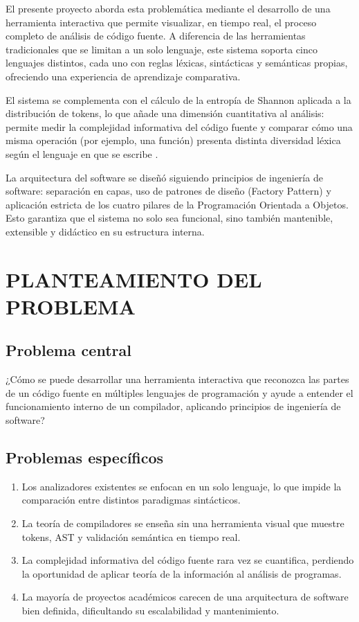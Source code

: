 \documentclass[12pt,a4paper]{article}
\begin{document}
El presente proyecto aborda esta problemática mediante el desarrollo de una herramienta interactiva que permite visualizar, en tiempo real, el proceso completo de análisis de código fuente. A diferencia de las herramientas tradicionales que se limitan a un solo lenguaje, este sistema soporta cinco lenguajes distintos, cada uno con reglas léxicas, sintácticas y semánticas propias, ofreciendo una experiencia de aprendizaje comparativa.

El sistema se complementa con el cálculo de la entropía de Shannon aplicada a la distribución de tokens, lo que añade una dimensión cuantitativa al análisis: permite medir la complejidad informativa del código fuente y comparar cómo una misma operación (por ejemplo, una función) presenta distinta diversidad léxica según el lenguaje en que se escribe \cite{shannon1948}.

La arquitectura del software se diseñó siguiendo principios de ingeniería de software: separación en capas, uso de patrones de diseño (Factory Pattern) y aplicación estricta de los cuatro pilares de la Programación Orientada a Objetos. Esto garantiza que el sistema no solo sea funcional, sino también mantenible, extensible y didáctico en su estructura interna.

\section{PLANTEAMIENTO DEL PROBLEMA}

\subsection{Problema central}

¿Cómo se puede desarrollar una herramienta interactiva que reconozca las partes de un código fuente en múltiples lenguajes de programación y ayude a entender el funcionamiento interno de un compilador, aplicando principios de ingeniería de software?

\subsection{Problemas específicos}

\begin{enumerate}[label=\textbf{P\arabic*:}]
    \item Los analizadores existentes se enfocan en un solo lenguaje, lo que impide la comparación entre distintos paradigmas sintácticos.
    \item La teoría de compiladores se enseña sin una herramienta visual que muestre tokens, AST y validación semántica en tiempo real.
    \item La complejidad informativa del código fuente rara vez se cuantifica, perdiendo la oportunidad de aplicar teoría de la información al análisis de programas.
    \item La mayoría de proyectos académicos carecen de una arquitectura de software bien definida, dificultando su escalabilidad y mantenimiento.
\end{enumerate}
\end{document}
